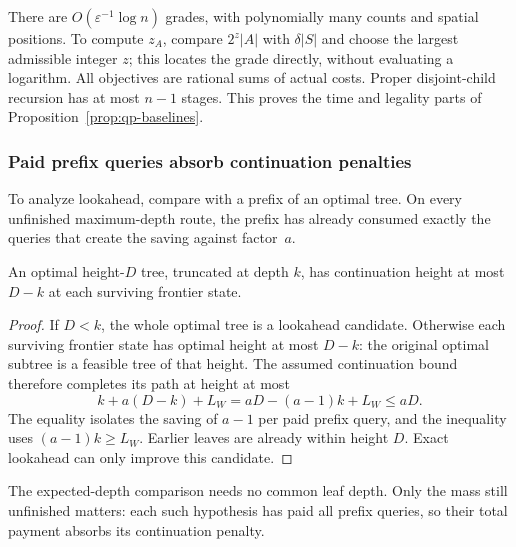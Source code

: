 

There are $O(\varepsilon^{-1}\log n)$ grades, with polynomially many
counts and spatial positions. To compute $z_A$, compare $2^z|A|$
with $\delta|S|$ and choose the largest admissible integer $z$;
this locates the grade directly, without evaluating a logarithm.
All objectives
are rational sums of actual costs. Proper disjoint-child recursion
has at most $n-1$ stages. This proves the time and legality parts of
Proposition~\ref{prop:qp-baselines}.

\subsubsection{Paid prefix queries absorb continuation penalties}

To analyze lookahead, compare with a prefix of an optimal tree. On
every unfinished maximum-depth route, the prefix has already consumed
exactly the queries that create the saving against factor~$a$.

\begin{claim}
\label{clm:lookahead-height-payment}
An optimal height-$D$ tree, truncated at depth $k$, has continuation
height at most $D-k$ at each surviving frontier state.
\end{claim}
\begin{proof}
If $D<k$, the whole optimal tree is a lookahead candidate. Otherwise
each surviving frontier state has optimal height at most $D-k$:
the original optimal subtree is a feasible tree of that height.
The assumed continuation bound therefore completes its path at height
at most
\[
 k+a(D-k)+L_W=aD-(a-1)k+L_W\le aD.
\]
The equality isolates the saving of $a-1$ per paid prefix query, and
the inequality uses $(a-1)k\ge L_W$. Earlier leaves are already
within height $D$. Exact lookahead can only improve this candidate.
\end{proof}

The expected-depth comparison needs no common leaf depth. Only the
mass still unfinished matters: each such hypothesis has paid all
prefix queries, so their total payment absorbs its continuation penalty.

